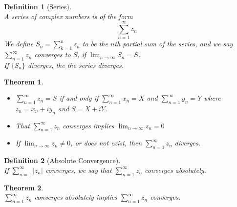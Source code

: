 \documentclass[12pt]{article}
\newtheorem{definition}{Definition}[section]
\newtheorem{theorem}{Theorem}[section]
\theoremstyle{definition}
\begin{document}
\begin{definition}[Series]
\hfill\\\normalfont A series of complex numbers is of the form
\[
\sum_{n=1}^\infty z_n
\]
We define $S_n = \sum_{k=1}^n z_n$ to be the $n$th partial sum of the series, and we say $\sum_{n=1}^\infty z_n$ converges to $S$, if  $\lim_{n\to\infty}S_n = S$.\\
If $\{S_n\}$ diverges, the the series diverges.
\end{definition}
\begin{theorem}
\hfill\\\normalfont \begin{itemize}
\item $\sum_{n=1}^\infty z_n = S$ if and only if $\sum_{n=1}^\infty x_n = X$ and $\sum_{n=1}^\infty y_n = Y$ where $z_n = x_n + iy_n$ and $S=X+iY$.
\item That $\sum_{n=1}^\infty z_n$ converges implies $\lim_{n\to\infty}z_n = 0$
\item If $\lim_{n\to\infty}z_n \neq 0$, or does not exist, then $\sum_{n=1}^\infty z_n$ diverges.
\end{itemize}
\end{theorem}
\begin{definition}[Absolute Convergence]
\hfill\\\normalfont If $\sum_{n=1}^\infty |z_n|$ converges, we say that $\sum_{n=1}^\infty z_n$ converges absolutely.\end{definition}
\begin{theorem}\hfill\\\normalfont $\sum_{n=1}^\infty z_n$ converges absolutely implies $\sum_{n=1}^\infty z_n$ converges.\end{theorem}
\end{document}
